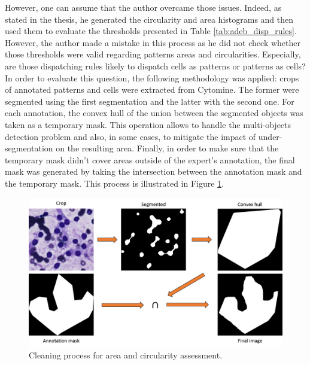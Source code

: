 However, one can assume that the author overcame those issues. Indeed, as stated in the thesis, he generated the circularity and area histograms and then used them to evaluate the thresholds presented in Table \ref{tab:adeb_disp_rules}. However, the author made a mistake in this process as he did not check whether those thresholds were valid regarding patterns areas and circularities. Especially, are those dispatching rules likely to dispatch cells as patterns or patterns as cells? In order to evaluate this question, the following methodology was applied: crops of annotated patterns and cells were extracted from Cytomine. The former were segmented using the first segmentation and the latter with the second one. For each annotation, the convex hull of the union between the segmented objects was taken as a temporary mask. This operation allows to handle the multi-objects detection problem and also, in some cases, to mitigate the impact of under-segmentation on the resulting area. Finally, in order to make sure that the temporary mask didn't cover areas outside of the expert's annotation, the final mask was generated by taking the intersection between the annotation mask and the temporary mask. This process is illustrated in Figure \ref{fig:annot_cleaning}.

\begin{figure}
	\center
	\includegraphics[scale=0.45]{image/area_annot_cleaning.png}
	\caption{Cleaning process for area and circularity assessment.}
	\label{fig:annot_cleaning}
\end{figure}

